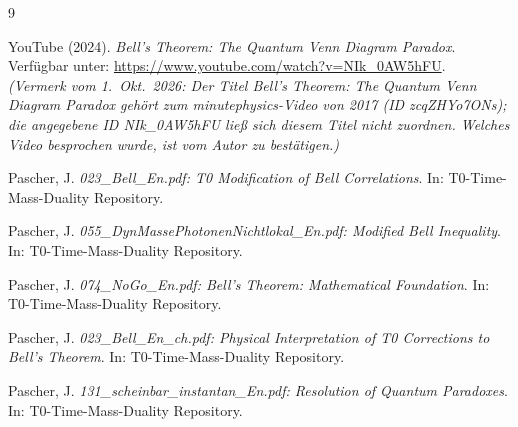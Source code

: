 \begin{thebibliography}{9}
	
	YouTube (2024). \emph{Bell's Theorem: The Quantum Venn Diagram Paradox}. 
	Verfügbar unter: \url{https://www.youtube.com/watch?v=NIk_0AW5hFU}.\\
	\textit{(Vermerk vom 1.~Okt.~2026: Der Titel \glqq Bell's Theorem: The Quantum Venn Diagram Paradox\grqq{} gehört zum minutephysics-Video von 2017 (ID zcqZHYo7ONs); die angegebene ID NIk\_0AW5hFU ließ sich diesem Titel nicht zuordnen. Welches Video besprochen wurde, ist vom Autor zu bestätigen.)}
	
	Pascher, J. \emph{023\_Bell\_En.pdf: T0 Modification of Bell Correlations}. 
	In: T0-Time-Mass-Duality Repository. 
	
	Pascher, J. \emph{055\_DynMassePhotonenNichtlokal\_En.pdf: Modified Bell Inequality}. 
	In: T0-Time-Mass-Duality Repository. 
	
	Pascher, J. \emph{074\_NoGo\_En.pdf: Bell's Theorem: Mathematical Foundation}. 
	In: T0-Time-Mass-Duality Repository. 
	
	Pascher, J. \emph{023\_Bell\_En\_ch.pdf: Physical Interpretation of T0 Corrections to Bell's Theorem}. 
	In: T0-Time-Mass-Duality Repository. 
	
	Pascher, J. \emph{131\_scheinbar\_instantan\_En.pdf: Resolution of Quantum Paradoxes}. 
	In: T0-Time-Mass-Duality Repository. 
	
\end{thebibliography}
	